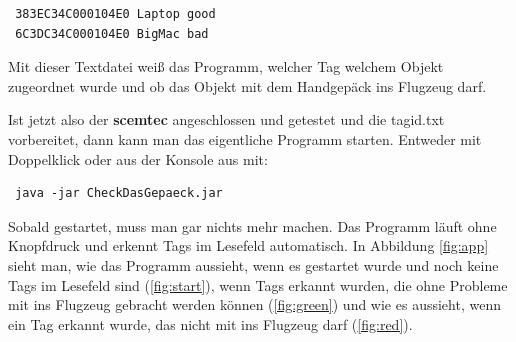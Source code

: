 \documentclass[paper=a4,fontsize=11pt,headsepline,footsepline,parskip=half]{scrartcl}
\begin{document}
\begin{lstlisting}
 383EC34C000104E0 Laptop good
 6C3DC34C000104E0 BigMac bad
\end{lstlisting}

Mit dieser Textdatei weiß das Programm, welcher Tag welchem Objekt zugeordnet wurde und ob das Objekt mit dem
Handgepäck ins Flugzeug darf.

Ist jetzt also der \textbf{scemtec} angeschlossen und getestet und die tagid.txt vorbereitet, dann kann
man das eigentliche Programm starten. Entweder mit Doppelklick oder aus der Konsole aus mit:

\begin{lstlisting}
 java -jar CheckDasGepaeck.jar
\end{lstlisting}

Sobald gestartet, muss man gar nichts mehr machen. Das Programm läuft ohne Knopfdruck und erkennt Tags im
Lesefeld automatisch. In Abbildung \ref{fig:app} sieht man, wie das Programm aussieht, wenn es gestartet
wurde und noch keine Tags im Lesefeld sind (\ref{fig:start}), wenn Tags erkannt wurden, die ohne Probleme
mit ins Flugzeug gebracht werden können (\ref{fig:green}) und wie es aussieht, wenn ein Tag erkannt wurde,
das nicht mit ins Flugzeug darf (\ref{fig:red}).
\end{document}
